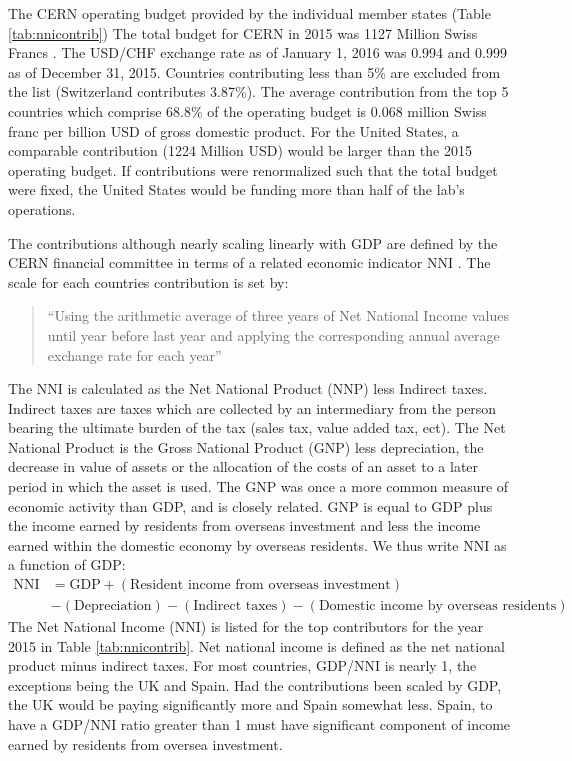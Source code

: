 The CERN operating budget provided by the individual member states (Table \ref{tab:nnicontrib}) 
The total budget for CERN in 2015 was 1127 Million Swiss Francs \cite{budget}. 
The USD/CHF exchange rate as of January 1, 2016 was 0.994 and 0.999 as of December 31, 2015. 
Countries contributing less than 5\% are excluded from the list (Switzerland contributes 3.87\%). 
The average contribution from the top 5 countries which comprise 68.8\% of the operating
budget is 0.068 million Swiss franc per billion USD of gross domestic product. 
For the United States, a comparable contribution (1224 Million USD) would be larger 
than the 2015 operating budget. If contributions were renormalized such that the total budget
were fixed, the United States would be funding more than half of the lab's operations. 

The contributions although nearly scaling linearly with GDP are defined by the CERN financial committee in 
terms of a related economic indicator NNI \cite{contribcalc} \cite{contribcalc2015}.  
The scale for each countries contribution is set by:
\begin{quote}
``Using the arithmetic average of three years of Net National
Income values until year before last year and applying the corresponding annual average
exchange rate for each year''
\end{quote}
The NNI is calculated as the Net National Product (NNP) less Indirect taxes. Indirect taxes are taxes which are
collected by an intermediary from the person bearing the ultimate burden of the tax (sales tax, value added tax, 
ect). The Net National Product is the Gross National Product (GNP) less depreciation, the decrease in value of 
assets or the allocation of the costs of an asset to a later period in which the asset is used. The GNP was
once a more common measure of economic activity than GDP, and is closely related. GNP is equal to GDP plus the
income earned by residents from overseas investment and less the income earned within the domestic economy by overseas residents. We thus write NNI as a function of GDP:
\begin{align*}
\text{NNI} &= \text{GDP} + (\text{Resident income from overseas investment})\\
 &- (\text{Depreciation}) - (\text{Indirect taxes}) - (\text{Domestic income by overseas residents})
\end{align*}
The Net National Income (NNI) is listed for the top contributors for the year 2015 in Table \ref{tab:nnicontrib}. 
Net national income is defined as the net national product minus indirect taxes. 
For most countries, GDP/NNI is nearly 1, the exceptions being the UK and Spain. Had the contributions
been scaled by GDP, the UK would be paying significantly more and Spain somewhat less. Spain, to have a 
GDP/NNI ratio greater than 1 must have significant component of income earned by residents from oversea
investment. 

